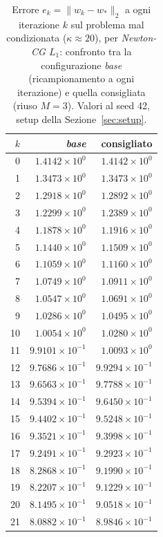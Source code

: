 \begin{table}[H]
\centering
\footnotesize
\renewcommand{\arraystretch}{0.85}
\setlength{\tabcolsep}{8pt}
\caption{Errore $e_k=\|w_k-w_*\|_2$ a ogni iterazione $k$ sul problema mal condizionata ($\kappa\approx 20$), per \emph{Newton-CG $L_1$}: confronto tra la configurazione \emph{base} (ricampionamento a ogni iterazione) e quella consigliata (riuso $M{=}3$). Valori al seed 42, setup della Sezione~\ref{sec:setup}.}
\label{tab:riuso_cons_malcond_nl1}
\begin{tabular}{@{}rrr@{}}
\toprule
$k$ & \emph{base} & consigliato\\
\midrule
0 & $1.4142\times10^{0}$ & $1.4142\times10^{0}$\\
1 & $1.3473\times10^{0}$ & $1.3473\times10^{0}$\\
2 & $1.2918\times10^{0}$ & $1.2892\times10^{0}$\\
3 & $1.2299\times10^{0}$ & $1.2389\times10^{0}$\\
4 & $1.1878\times10^{0}$ & $1.1916\times10^{0}$\\
5 & $1.1440\times10^{0}$ & $1.1509\times10^{0}$\\
6 & $1.1059\times10^{0}$ & $1.1160\times10^{0}$\\
7 & $1.0749\times10^{0}$ & $1.0911\times10^{0}$\\
8 & $1.0547\times10^{0}$ & $1.0691\times10^{0}$\\
9 & $1.0286\times10^{0}$ & $1.0495\times10^{0}$\\
10 & $1.0054\times10^{0}$ & $1.0280\times10^{0}$\\
11 & $9.9101\times10^{-1}$ & $1.0093\times10^{0}$\\
12 & $9.7686\times10^{-1}$ & $9.9294\times10^{-1}$\\
13 & $9.6563\times10^{-1}$ & $9.7788\times10^{-1}$\\
14 & $9.5394\times10^{-1}$ & $9.6450\times10^{-1}$\\
15 & $9.4402\times10^{-1}$ & $9.5248\times10^{-1}$\\
16 & $9.3521\times10^{-1}$ & $9.3998\times10^{-1}$\\
17 & $9.2491\times10^{-1}$ & $9.2923\times10^{-1}$\\
18 & $8.2868\times10^{-1}$ & $9.1990\times10^{-1}$\\
19 & $8.2207\times10^{-1}$ & $9.1229\times10^{-1}$\\
20 & $8.1495\times10^{-1}$ & $9.0518\times10^{-1}$\\
21 & $8.0882\times10^{-1}$ & $8.9846\times10^{-1}$\\

\end{tabular}
\end{table}
